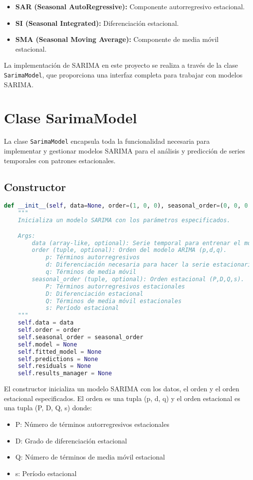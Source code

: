 \documentclass[12pt,letterpaper]{report}
\begin{document}
\begin{itemize}
    \item \textbf{SAR (Seasonal AutoRegressive):} Componente autorregresivo estacional.
    \item \textbf{SI (Seasonal Integrated):} Diferenciación estacional.
    \item \textbf{SMA (Seasonal Moving Average):} Componente de media móvil estacional.
\end{itemize}

La implementación de SARIMA en este proyecto se realiza a través de la clase \texttt{SarimaModel}, que proporciona una interfaz completa para trabajar con modelos SARIMA.

\section{Clase SarimaModel}
La clase \texttt{SarimaModel} encapsula toda la funcionalidad necesaria para implementar y gestionar modelos SARIMA para el análisis y predicción de series temporales con patrones estacionales.

\subsection{Constructor}
\begin{lstlisting}[language=python]
def __init__(self, data=None, order=(1, 0, 0), seasonal_order=(0, 0, 0, 0)):
    """
    Inicializa un modelo SARIMA con los parámetros especificados.

    Args:
        data (array-like, optional): Serie temporal para entrenar el modelo.
        order (tuple, optional): Orden del modelo ARIMA (p,d,q).
            p: Términos autorregresivos
            d: Diferenciación necesaria para hacer la serie estacionaria
            q: Términos de media móvil
        seasonal_order (tuple, optional): Orden estacional (P,D,Q,s).
            P: Términos autorregresivos estacionales
            D: Diferenciación estacional
            Q: Términos de media móvil estacionales
            s: Período estacional
    """
    self.data = data
    self.order = order
    self.seasonal_order = seasonal_order
    self.model = None
    self.fitted_model = None
    self.predictions = None
    self.residuals = None
    self.results_manager = None
\end{lstlisting}

El constructor inicializa un modelo SARIMA con los datos, el orden y el orden estacional especificados. El orden es una tupla (p, d, q) y el orden estacional es una tupla (P, D, Q, s) donde:
\begin{itemize}
    \item P: Número de términos autorregresivos estacionales
    \item D: Grado de diferenciación estacional
    \item Q: Número de términos de media móvil estacional
    \item s: Período estacional
\end{itemize}
\end{document}

